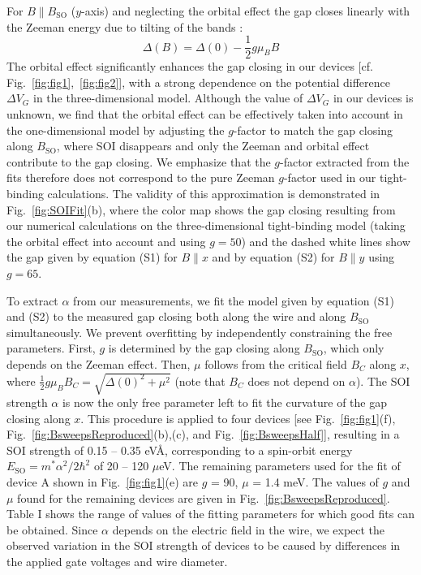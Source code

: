 For $B \parallel B_{\mathrm{SO}}$ ($y$-axis) and neglecting the orbital effect the gap closes linearly with the Zeeman energy due to tilting of the bands \cite{Osca2014,Rex2014}:
\begin{equation}
\Delta(B) = \Delta(0) - \frac{1}{2}g\mu_BB
\end{equation}
The orbital effect significantly enhances the gap closing in our devices [cf.
Fig.~\ref{fig:fig1},~\ref{fig:fig2}], with a  strong dependence on the potential difference $\Delta V_G$ in the three-dimensional model.
Although the value of $\Delta V_G$ in our devices is unknown, we find that the orbital effect can be effectively taken into account in the one-dimensional model by adjusting the $g$-factor to match the gap closing along $B_{\mathrm{SO}}$, where SOI disappears and only the Zeeman and orbital effect contribute to the gap closing.
We emphasize that the $g$-factor extracted from the fits therefore does not correspond to the pure Zeeman $g$-factor used in our tight-binding calculations.
The validity of this approximation is demonstrated in Fig.~\ref{fig:SOIFit}(b), where the color map shows the gap closing resulting from our numerical calculations on the three-dimensional tight-binding model (taking the orbital effect into account and using $g = 50$) and the dashed white lines show the gap given by equation (S1) for $B\parallel x$ and by equation (S2) for $B\parallel y$ using $g=65$.

To extract $\alpha$ from our measurements, we fit the model given by equation (S1) and (S2) to the measured gap closing both along the wire and along $B_{\mathrm{SO}}$ simultaneously.
We prevent overfitting by independently constraining the free parameters.
First, $g$ is determined by the gap closing along $B_{\mathrm{SO}}$, which only depends on the Zeeman effect.
Then, $\mu$ follows from the critical field $B_C$ along $x$, where $\frac{1}{2}g\mu_BB_C = \sqrt{\Delta(0)^2+\mu^2}$ \cite{Lutchyn2010,Oreg2010} (note that $B_C$ does not depend on $\alpha$).
The SOI strength $\alpha$ is now the only free parameter left to fit the curvature of the gap closing along $x$.
This procedure is applied to four devices [see Fig.~\ref{fig:fig1}(f), Fig.~\ref{fig:BsweepsReproduced}(b),(c), and Fig.~\ref{fig:BsweepsHalf}], resulting in a SOI strength of 0.15 -- 0.35 eV\AA, corresponding to a spin-orbit energy $E_{\mathrm{SO}}=m^*\alpha^2/2\hbar^2$ of 20 -- 120 $\mu$eV.  %
The remaining parameters used for the fit of device A shown in Fig.~\ref{fig:fig1}(e) are $g$ = 90, $\mu$ = 1.4 meV.
The values of $g$ and $\mu$ found for the remaining devices are given in Fig.~\ref{fig:BsweepsReproduced}.
Table I shows the range of values of the fitting parameters for which good fits can be obtained.
Since $\alpha$ depends on the electric field in the wire, we expect the observed variation in the SOI strength of devices to be caused by differences in the applied gate voltages and wire diameter.

